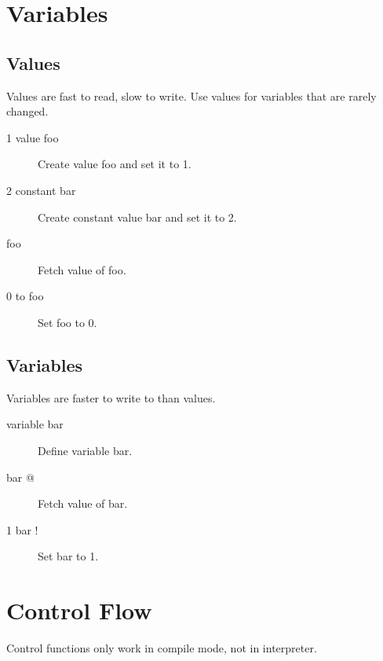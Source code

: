 \section{Variables}

\subsection{Values}

Values are fast to read, slow to write. Use values for variables
that are rarely changed. 

\begin{description}
\item[1 value foo] Create value foo and set it to 1.
\item[2 constant bar] Create constant value bar and set it to 2.
\item[foo] Fetch value of foo.
\item[0 to foo] Set foo to 0.
\end{description}

\subsection{Variables}

Variables are faster to write to than values.

\begin{description}
\item[variable bar] Define variable bar.
\item[bar @] Fetch value of bar.
\item[1 bar !] Set bar to 1.
\end{description}

\section{Control Flow}

Control functions only work in compile mode, not in interpreter.

